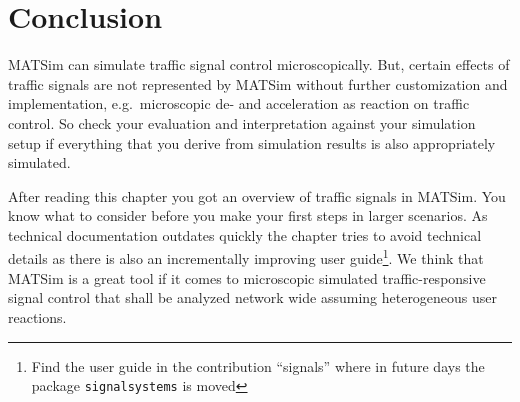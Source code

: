 \section{Conclusion} %
\label{sec:signals_evaluation_conclusion}

MATSim can simulate traffic signal control microscopically. 
But, certain effects of traffic signals are not represented by MATSim without further customization and implementation, e.g.~microscopic de- and acceleration as reaction on traffic control. 
So check your evaluation and interpretation against your simulation setup if everything that you derive from simulation results is also appropriately simulated.  


After reading this chapter you got an overview of traffic signals in MATSim. 
You know what to consider before you make your first steps in  larger scenarios. 
As technical documentation outdates quickly the chapter tries to avoid technical details as there is also an incrementally improving user guide\footnote{Find the user guide  in the contribution ``signals'' where in future days the package \lstinline|signalsystems| is moved }.  
We think that MATSim is a great tool if it comes to microscopic simulated traffic-responsive signal control that shall be analyzed network wide assuming heterogeneous user reactions. 


